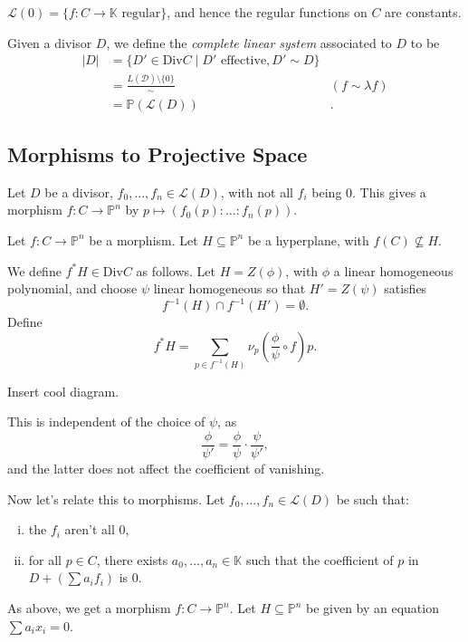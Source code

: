 \documentclass[12pt]{article}
\begin{document}
\begin{remark}
	$\mathcal{L}(0) = \{f : C \to \mathbb{K} \text{ regular}\}$, and hence the regular functions on $C$ are constants.
\end{remark}

\begin{definition}
	Given a divisor $D$, we define the \emph{complete linear system} associated to $D$ to be
	\begin{align*}
		|D| &= \{D' \in \mathrm{Div} C \mid D' \text{ effective}, D' \sim D\} &\\
		    &= \frac{L(\mathcal{D}) \setminus \{0\}}{\sim} &(f \sim \lambda f)\\
		    &= \mathbb{P}(\mathcal{L}(D)) &.
	\end{align*}
\end{definition}

\subsection{Morphisms to Projective Space}%
\label{sub:morph_proj}

Let $D$ be a divisor, $f_0, \ldots, f_n \in \mathcal{L}(D)$, with not all $f_i$ being 0. This gives a morphism $f : C \to \mathbb{P}^n$ by $p \mapsto (f_0(p): \ldots : f_n(p))$.

\begin{definition}
	Let $f : C \to \mathbb{P}^n$ be a morphism. Let $H \subseteq \mathbb{P}^n$ be a hyperplane, with $f(C) \not\subseteq H$.

	We define $f^\ast H \in \mathrm{Div} C$ as follows. Let $H = Z(\phi)$, with $\phi$ a linear homogeneous polynomial, and choose $\psi$ linear homogeneous so that $H' = Z(\psi)$ satisfies
	\[
	f^{-1}(H) \cap f^{-1}(H') = \emptyset.
	\]
	Define
	\[
	f^\ast H = \sum_{p \in f^{-1}(H)} \nu_p\left( \frac{\phi}{\psi} \circ f \right) p.
	\]
\end{definition}

Insert cool diagram.

\begin{remark}
	This is independent of the choice of $\psi$, as
	\[
	\frac{\phi}{\psi'} = \frac{\phi}{\psi} \cdot \frac{\psi}{\psi'},
	\]
	and the latter does not affect the coefficient of vanishing.
\end{remark}

Now let's relate this to morphisms. Let $f_0, \ldots, f_n \in \mathcal{L}(D)$ be such that:
\begin{enumerate}[(i)]
	\item the $f_i$ aren't all $0$,
	\item for all $p \in C$, there exists $a_0, \ldots, a_n \in \mathbb{K}$ such that the coefficient of $p$ in $D + (\sum a_i f_i)$ is 0.
\end{enumerate}
As above, we get a morphism $f : C \to \mathbb{P}^n$. Let $H \subseteq \mathbb{P}^n$ be given by an equation $\sum a_i x_i = 0$.
\end{document}
